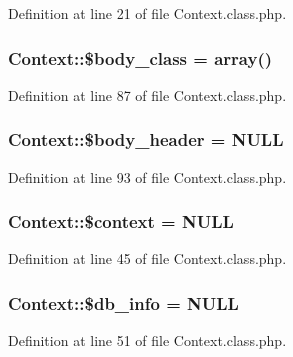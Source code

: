 Definition at line 21 of file Context.\+class.\+php.

\hypertarget{classContext_af0bb833a3157d6d2153d7858cb60e435}{
\subsubsection[{\$body\+\_\+class}]{\setlength{\rightskip}{0pt plus 5cm}Context\+::\$body\+\_\+class = array()}}\label{classContext_af0bb833a3157d6d2153d7858cb60e435}


Definition at line 87 of file Context.\+class.\+php.

\hypertarget{classContext_aa2c90f49a1f6389eadea8962d0fbf5b3}{
\subsubsection[{\$body\+\_\+header}]{\setlength{\rightskip}{0pt plus 5cm}Context\+::\$body\+\_\+header = N\+U\+L\+L}}\label{classContext_aa2c90f49a1f6389eadea8962d0fbf5b3}


Definition at line 93 of file Context.\+class.\+php.

\hypertarget{classContext_a39e9103dacbca5e5fa49d6e93f0ccec3}{
\subsubsection[{\$context}]{\setlength{\rightskip}{0pt plus 5cm}Context\+::\$context = N\+U\+L\+L}}\label{classContext_a39e9103dacbca5e5fa49d6e93f0ccec3}


Definition at line 45 of file Context.\+class.\+php.

\hypertarget{classContext_a6f4d307bdcb4bfd83fda27bc265977eb}{
\subsubsection[{\$db\+\_\+info}]{\setlength{\rightskip}{0pt plus 5cm}Context\+::\$db\+\_\+info = N\+U\+L\+L}}\label{classContext_a6f4d307bdcb4bfd83fda27bc265977eb}


Definition at line 51 of file Context.\+class.\+php.


